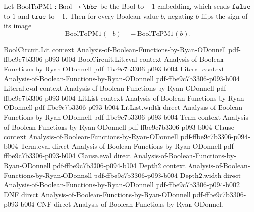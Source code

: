 \begin{lemma}
\label{BoolFourier.BoolToPM1_not}
\leanok
{}
Let $\mathrm{BoolToPM1} : \mathrm{Bool} \to \bbr$ be the Bool-to-$\pm 1$ embedding,
which sends $\mathtt{false}$ to $1$ and $\mathtt{true}$ to $-1$. Then for every Boolean
value $b$, negating $b$ flips the sign of its image:
\[
  \mathrm{BoolToPM1}(\lnot b) = -\,\mathrm{BoolToPM1}(b).
\]
\end{lemma}

\begin{lemma}
\label{BoolFourier.BoolToPM1_xor}
\leanok
{}
\proofstep
  {BoolCircuit.Lit}
  {context}
  {Analysis-of-Boolean-Functions-by-Ryan-ODonnell}
  {pdf-ffbe9c7b3306-p093-b004}
\proofstep
  {BoolCircuit.Lit.eval}
  {context}
  {Analysis-of-Boolean-Functions-by-Ryan-ODonnell}
  {pdf-ffbe9c7b3306-p093-b004}
\proofstep
  {Literal}
  {context}
  {Analysis-of-Boolean-Functions-by-Ryan-ODonnell}
  {pdf-ffbe9c7b3306-p093-b004}
\proofstep
  {Literal.eval}
  {context}
  {Analysis-of-Boolean-Functions-by-Ryan-ODonnell}
  {pdf-ffbe9c7b3306-p093-b004}
\proofstep
  {LitList}
  {context}
  {Analysis-of-Boolean-Functions-by-Ryan-ODonnell}
  {pdf-ffbe9c7b3306-p093-b004}
\proofstep
  {LitList.width}
  {direct}
  {Analysis-of-Boolean-Functions-by-Ryan-ODonnell}
  {pdf-ffbe9c7b3306-p093-b004}
\proofstep
  {Term}
  {context}
  {Analysis-of-Boolean-Functions-by-Ryan-ODonnell}
  {pdf-ffbe9c7b3306-p093-b004}
\proofstep
  {Clause}
  {context}
  {Analysis-of-Boolean-Functions-by-Ryan-ODonnell}
  {pdf-ffbe9c7b3306-p094-b004}
\proofstep
  {Term.eval}
  {direct}
  {Analysis-of-Boolean-Functions-by-Ryan-ODonnell}
  {pdf-ffbe9c7b3306-p093-b004}
\proofstep
  {Clause.eval}
  {direct}
  {Analysis-of-Boolean-Functions-by-Ryan-ODonnell}
  {pdf-ffbe9c7b3306-p094-b004}
\proofstep
  {Depth2}
  {context}
  {Analysis-of-Boolean-Functions-by-Ryan-ODonnell}
  {pdf-ffbe9c7b3306-p093-b004}
\proofstep
  {Depth2.width}
  {direct}
  {Analysis-of-Boolean-Functions-by-Ryan-ODonnell}
  {pdf-ffbe9c7b3306-p094-b002}
\proofstep
  {DNF}
  {direct}
  {Analysis-of-Boolean-Functions-by-Ryan-ODonnell}
  {pdf-ffbe9c7b3306-p093-b004}
\proofstep
  {CNF}
  {direct}
  {Analysis-of-Boolean-Functions-by-Ryan-ODonnell}

\end{lemma}
